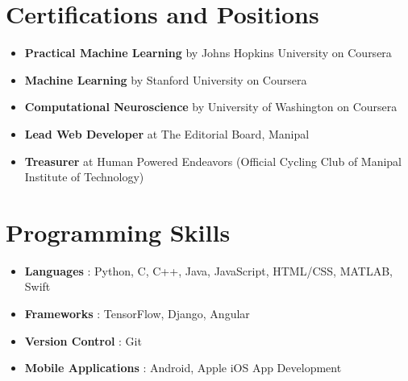 \documentclass[letterpaper,12pt]{article}
\newcommand{\resumeItemCourse}[2]{
  \item\small{
    \textbf{#1}{ #2 \vspace{-2pt}}
  }
}
\newcommand{\resumeSubItemCourse}[2]{\resumeItemCourse{#1}{#2}\vspace{-4pt}}
\newcommand{\resumeSubHeadingListStart}{\begin{itemize}[leftmargin=*]}
\newcommand{\resumeSubHeadingListEnd}{\end{itemize}}
\begin{document}
\section{Certifications and Positions}
  \resumeSubHeadingListStart
    \resumeSubItemCourse{Practical Machine Learning}
      {by Johns Hopkins University on Coursera}
    \resumeSubItemCourse{Machine Learning}
      {by Stanford University on Coursera}
    \resumeSubItemCourse{Computational Neuroscience}
      {by University of Washington on Coursera}
    \resumeSubItemCourse{Lead Web Developer}
      {at The Editorial Board, Manipal}
    \resumeSubItemCourse{Treasurer}
      {at Human Powered Endeavors (Official Cycling Club of Manipal Institute of Technology)}
  \resumeSubHeadingListEnd

\section{Programming Skills}
  \resumeSubHeadingListStart
    \resumeSubItemCourse{Languages}
    {: Python, C, C++, Java, JavaScript, HTML/CSS, MATLAB, Swift}
    \resumeSubItemCourse{Frameworks}
    {: TensorFlow, Django, Angular}
    \resumeSubItemCourse{Version Control}
    {: Git}
    \resumeSubItemCourse{Mobile Applications}
    {: Android, Apple iOS App Development}
    
  \resumeSubHeadingListEnd


\end{document}

